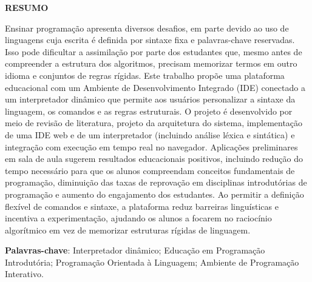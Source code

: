 \documentclass[
        oneside,      %
        english,			
        brazil			 
        ]{configcefetmglpd}
\begin{document}

\begin{resumo_cefetmg}
	
\begin{center}
    \textbf{RESUMO} 
\end{center}


Ensinar programação apresenta diversos desafios, em parte devido ao uso de linguagens cuja escrita é definida por sintaxe fixa e palavras-chave reservadas. Isso pode dificultar a assimilação por parte dos estudantes que, mesmo antes de compreender a estrutura dos algoritmos, precisam memorizar termos em outro idioma e conjuntos de regras rígidas. Este trabalho propõe uma plataforma educacional com um Ambiente de Desenvolvimento Integrado (IDE) conectado a um interpretador dinâmico que permite aos usuários personalizar a sintaxe da linguagem, os comandos e as regras estruturais. O projeto é desenvolvido por meio de revisão de literatura, projeto da arquitetura do sistema, implementação de uma IDE web e de um interpretador (incluindo análise léxica e sintática) e integração com execução em tempo real no navegador. Aplicações preliminares em sala de aula sugerem resultados educacionais positivos, incluindo redução do tempo necessário para que os alunos compreendam conceitos fundamentais de programação, diminuição das taxas de reprovação em disciplinas introdutórias de programação e aumento do engajamento dos estudantes. Ao permitir a definição flexível de comandos e sintaxe, a plataforma reduz barreiras linguísticas e incentiva a experimentação, ajudando os alunos a focarem no raciocínio algorítmico em vez de memorizar estruturas rígidas de linguagem.


\noindent
\textbf{Palavras-chave}: Interpretador dinâmico; Educação em Programação Introdutória; Programação Orientada à Linguagem; Ambiente de Programação Interativo.

\end{resumo_cefetmg}
 
\end{document}
